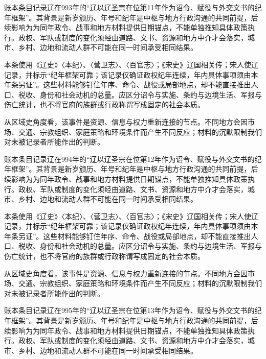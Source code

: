 账本条目记录辽在993年的“辽以辽圣宗在位第11年作为诏令、赋役与外交文书的纪年框架”。其背景是新岁颁历、年号和纪年是中枢与地方行政沟通的共同前提，后续影响为为同年政令、战事和地方材料提供日期锚点，不能单独推知具体政策执行。政权、军队或制度的变化须经由道路、文书、资源和地方中介才会落实，城市、乡村、边地和流动人群不可能在同一时间承受相同结果。

本条使用《辽史》〈本纪〉、〈营卫志〉、〈百官志〉；《宋史》辽国相关传；宋人使辽记录，并标示“纪年框架可靠；该记录仅确证政权纪年连续，年内具体事项须由本年条另证”。这些材料能够钉住年序、命令、战役或局部地点，却不能直接推出人口、税收、身份和社会动机的总量。应区分诏令与实施、条约与边境生活、军报与伤亡统计，也不将官府的族群或行政称谓写成固定的社会本质。

从区域史角度看，该事件是资源、信息与权力重新连接的节点。不同地方会因市场、交通、宗教组织、家庭策略和环境条件而产生不同反应；材料的沉默限制我们对未被记录者所能作出的判断。

账本条目记录辽在994年的“辽以辽圣宗在位第12年作为诏令、赋役与外交文书的纪年框架”。其背景是新岁颁历、年号和纪年是中枢与地方行政沟通的共同前提，后续影响为为同年政令、战事和地方材料提供日期锚点，不能单独推知具体政策执行。政权、军队或制度的变化须经由道路、文书、资源和地方中介才会落实，城市、乡村、边地和流动人群不可能在同一时间承受相同结果。

本条使用《辽史》〈本纪〉、〈营卫志〉、〈百官志〉；《宋史》辽国相关传；宋人使辽记录，并标示“纪年框架可靠；该记录仅确证政权纪年连续，年内具体事项须由本年条另证”。这些材料能够钉住年序、命令、战役或局部地点，却不能直接推出人口、税收、身份和社会动机的总量。应区分诏令与实施、条约与边境生活、军报与伤亡统计，也不将官府的族群或行政称谓写成固定的社会本质。

从区域史角度看，该事件是资源、信息与权力重新连接的节点。不同地方会因市场、交通、宗教组织、家庭策略和环境条件而产生不同反应；材料的沉默限制我们对未被记录者所能作出的判断。

账本条目记录辽在995年的“辽以辽圣宗在位第13年作为诏令、赋役与外交文书的纪年框架”。其背景是新岁颁历、年号和纪年是中枢与地方行政沟通的共同前提，后续影响为为同年政令、战事和地方材料提供日期锚点，不能单独推知具体政策执行。政权、军队或制度的变化须经由道路、文书、资源和地方中介才会落实，城市、乡村、边地和流动人群不可能在同一时间承受相同结果。

